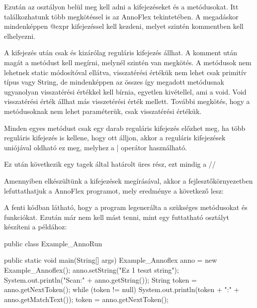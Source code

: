 Ezután az osztályon belül meg kell adni a kifejezéseket és a metódusokat. Itt találkozhatunk több megkötéssel is az AnnoFlex tekintetében. A megadáskor mindenképpen @expr kifejezéssel kell kezdeni, melyet szintén kommentben kell elhelyezni.

A kifejezés után csak és kizárólag reguláris kifejezés állhat. A komment után magát a metódust kell megírni, melynél szintén van megkötés. A metódusok nem lehetnek static módosítóval ellátva, visszatérési értékük nem lehet csak primitív típus vagy String, de mindenképpen az összes így megadott metódusnak ugyanolyan visszatérési értékkel kell bírnia, egyetlen kivétellel, ami a void. Void visszatérési érték állhat más visszetérési érték mellett. További megkötés, hogy a metódusoknak nem lehet paraméterük, csak visszatérési értékük.

Minden egyes metódust csak egy darab reguláris kifejezés előzhet meg, ha több reguláris kifejezés is kellene, hogy ott álljon, akkor a reguláris kifejezések uniójával oldható ez meg, melyhez a | operátor használható.

Ez után következik egy tagek által határolt üres rész, ezt mindig a //%

Amennyiben elkészültünk a kifejezések megírásával, akkor a fejlesztőkörnyezetben lefuttathatjuk a AnnoFlex programot, mely eredménye a következő lesz:



A fenti kódban látható, hogy a program legenerálta a szükséges metódusokat és funkciókat. Ezután már nem kell mást tenni, mint egy futtatható osztályt készíteni a példához:

\begin{java}
public class Example_AnnoRun {

	public static void main(String[] args) {
		Example_Annoflex anno = new Example_Annoflex();
		anno.setString("Ez 1 teszt string");
		System.out.println("Scan:" + anno.getString());
		String token = anno.getNextToken();
		while (token != null) {
			System.out.println(token + ":" + anno.getMatchText());
			token = anno.getNextToken();
		}
	}

}
\end{java}


